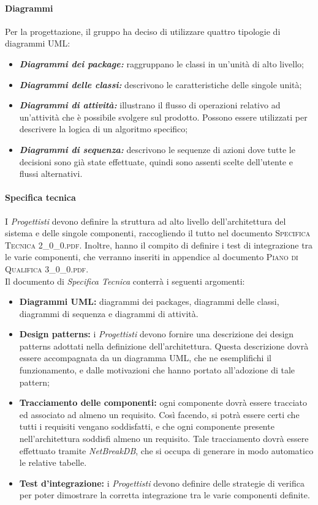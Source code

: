 		\paragraph{Diagrammi}
		Per la progettazione, il gruppo ha deciso di utilizzare quattro tipologie di diagrammi UML:
		\begin{itemize}
			\item \textbf{\textit{Diagrammi dei package:}} raggruppano le classi in un'unità di alto livello;
			\item \textbf{\textit{Diagrammi delle classi:}} descrivono le caratteristiche delle singole unità;
			\item \textbf{\textit{Diagrammi di attività:}} illustrano il flusso di operazioni relativo ad un'attività che è possibile svolgere sul prodotto. Possono essere utilizzati per descrivere la logica di un algoritmo specifico;
			\item \textbf{\textit{Diagrammi di sequenza:}} descrivono le sequenze di azioni dove tutte le decisioni sono già state effettuate, quindi sono assenti scelte dell'utente e flussi alternativi.
		\end{itemize}
	
	\paragraph{Specifica tecnica}
	I \textit{Progettisti} devono definire la struttura ad alto livello dell'architettura del sistema e delle singole componenti, raccogliendo il tutto nel documento \textsc{Specifica Tecnica 2\_0\_0.pdf}. Inoltre, hanno il compito di definire i test di integrazione tra le varie componenti, che verranno inseriti in appendice al documento \textsc{Piano di Qualifica 3\_0\_0.pdf}. \\
	Il documento di \textit{Specifica Tecnica} conterrà i seguenti argomenti:
	\begin{itemize}
		\item \textbf{Diagrammi UML:} diagrammi dei packages, diagrammi delle classi, diagrammi di sequenza e diagrammi di attività.
		\item \textbf{Design patterns:} i \textit{Progettisti} devono fornire una descrizione dei design patterns adottati nella definizione dell'architettura. Questa descrizione dovrà essere accompagnata da un diagramma UML, che ne esemplifichi il funzionamento, e dalle motivazioni che hanno portato all'adozione di tale pattern;
		\item \textbf{Tracciamento delle componenti:} ogni componente dovrà essere tracciato ed associato ad almeno un requisito. Così facendo, si potrà essere certi che tutti i requisiti vengano soddisfatti, e che ogni componente presente nell'architettura soddisfi almeno un requisito. Tale tracciamento dovrà essere effettuato tramite \textit{NetBreakDB}, che si occupa di generare in modo automatico le relative tabelle.
		\item \textbf{Test d'integrazione:} i \textit{Progettisti} devono definire delle strategie di verifica per poter dimostrare la corretta integrazione tra le varie componenti definite.
	\end{itemize}
	
